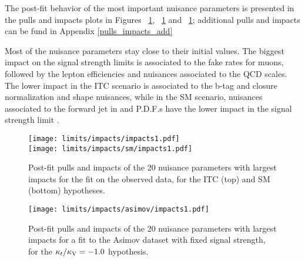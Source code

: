 The post-fit behavior of the most important nuisance parameters is presented in the pulls and impacts plots in Figures ~\ref{fig:impacts}, ~\ref{fig:impacts} and ~\ref{fig:impacts}; additional pulls and impacts can be fund in Appendix \ref{pulls_impacts_add} 

Most of the nuisance parameters stay close to their initial values. The biggest impact on the signal strength limits is associated to the fake rates for muons, followed by the lepton efficiencies and nuisances associated to the QCD scales. The lower impact in the ITC scenario is associated to the b-tag and \tHq closure normalization and shape nuisances, while in the SM scenario, nuisances associated to the forward jet in \tHq and P.D.F.s have the lower impact in the signal strength limit .

\begin{figure} [!th]
 \centering
 \texttt{[image: limits/impacts/impacts1.pdf]}\\
 \texttt{[image: limits/impacts/sm/impacts1.pdf]}\\        
\caption[Post-fit pulls and impacts.]{Post-fit pulls and impacts of the 20 nuisance parameters with largest impacts for the fit on the observed data, for the ITC (top) and SM (bottom) hypotheses.}
\label{fig:impacts}
\end{figure}


\begin{figure} [!h]
 \centering
 \texttt{[image: limits/impacts/asimov/impacts1.pdf]}\\
\caption[Post-fit pulls an impacts for a fit to the Asimov dataset.]{Post-fit pulls and impacts of the 20 nuisance parameters with largest impacts for a fit to the Asimov dataset with fixed signal strength, for the $\kappa_t/\kappa_\text{V}=-1.0$ hypothesis.}
\label{fig:impacts_asimov}
\end{figure}

